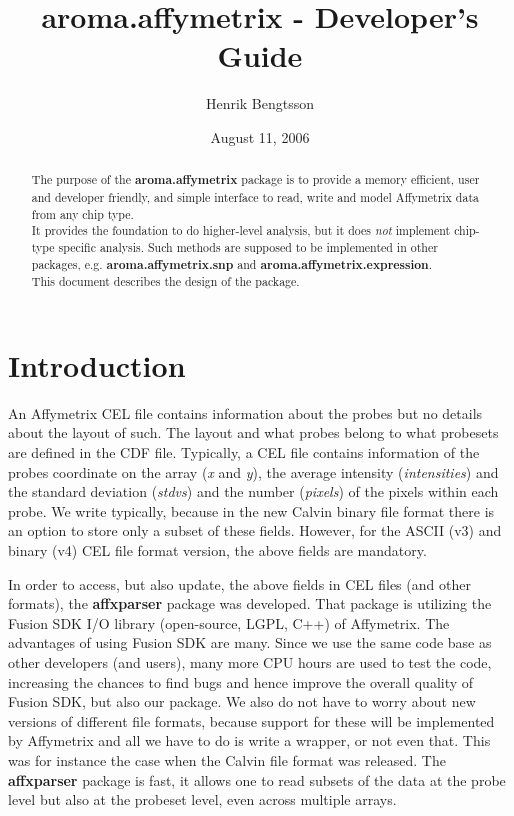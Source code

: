 \documentclass[12pt,a4paper]{article}
\title{aroma.affymetrix - Developer's Guide}
\author{Henrik Bengtsson}
\date{August 11, 2006}
\newcommand{\package}[1]{\textbf{#1}\xspace}
\newcommand{\name}[1]{\textsl{#1}\xspace}
\begin{document}
\maketitle

\begin{abstract}
The purpose of the \package{aroma.affymetrix} package is to provide a memory efficient, user and developer friendly, and simple interface to read, write and model Affymetrix data from any chip type.\\

It provides the foundation to do higher-level analysis, but it does \emph{not} implement chip-type specific analysis.  Such methods are supposed to be implemented in other packages, e.g. \package{aroma.affymetrix.snp} and \package{aroma.affymetrix.expression}.\\

This document describes the design of the package.
\end{abstract}


\section{Introduction}
An Affymetrix CEL file contains information about the probes but no details about the layout of such.  The layout and what probes belong to what probesets are defined in the CDF file.  Typically, a CEL file contains information of the probes coordinate on the array (\name{x} and \name{y}), the average intensity (\name{intensities}) and the standard deviation (\name{stdvs}) and the number (\name{pixels}) of the pixels within each probe.  We write typically, because in the new Calvin binary file format there is an option to store only a subset of these fields.  However, for the ASCII (v3) and binary (v4) CEL file format version, the above fields are mandatory.

In order to access, but also update, the above fields in CEL files (and other formats), the \package{affxparser} package was developed.  That package is utilizing the Fusion SDK I/O library (open-source, LGPL, C++) of Affymetrix.  The advantages of using Fusion SDK are many.  Since we use the same code base as other developers (and users), many more CPU hours are used to test the code, increasing the chances to find bugs and hence improve the overall quality of Fusion SDK, but also our package.  We also do not have to worry about new versions of different file formats, because support for these will be implemented by Affymetrix and all we have to do is write a wrapper, or not even that.  This was for instance the case when the Calvin file format was released.  The \package{affxparser} package is fast, it allows one to read subsets of the data at the probe level but also at the probeset level, even across multiple arrays.
\end{document}
